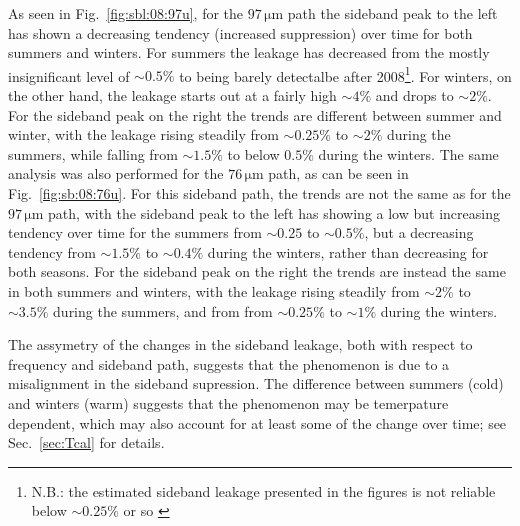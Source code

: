 As seen in Fig.~\ref{fig:sbl:08:97u}, for the $97\,\mathrm{\mu m}$ path the
sideband peak to the left has shown a decreasing tendency (increased
suppression) over time for both summers and winters. For summers the
leakage has decreased from the mostly insignificant level of $\sim0.5\%$ to
being barely detectalbe after 2008\footnote{N.B.: the estimated sideband
leakage presented in the figures is not reliable below $\sim0.25\%$ or so
\label{fn:sblestimate}}. For winters, on the other hand, the leakage starts out
at a fairly high $\sim4\%$ and drops to $\sim2\%$. For the sideband peak on the
right the trends are different between summer and winter, with the leakage
rising steadily from $\sim0.25\%$ to $\sim2\%$ during the summers, while
falling from $\sim1.5\%$ to below $0.5\%$ during the
winters.
The same analysis was also performed for the $76\,\mathrm{\mu m}$ path, as can
be seen in Fig.~\ref{fig:sb:08:76u}.  For this sideband path, the trends are
not the same as for the $97\,\mathrm{\mu m}$ path, with the sideband peak to
the left has showing a low but increasing tendency over time for the summers
from $\sim0.25$ to $\sim0.5\%$, but a decreasing tendency from $\sim1.5\%$ to
$\sim0.4\%$ during the winters, rather than decreasing
for both seasons. For the sideband peak on the right the trends are instead the
same in both summers and winters, with the leakage
rising steadily from $\sim2\%$ to $\sim3.5\%$ during the summers, and from
from $\sim0.25\%$ to $\sim1\%$ during the winters.

The assymetry of the changes in the sideband leakage, both with respect to
frequency and sideband path, suggests that the phenomenon is due to a
misalignment in the sideband supression.  The difference between summers (cold)
and winters (warm) suggests that the phenomenon may be temerpature dependent,
which may also account for at least some of the change over time; see
Sec.~\ref{sec:Tcal} for details.
